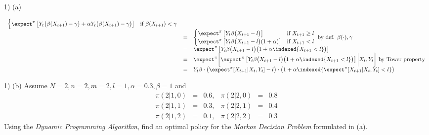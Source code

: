 \documentclass[11pt,a4paper]{article}
\begin{document}
\begin{answer}{1) (a)}
\begin{itemize}
\[\begin{array}{rcl}
\begin{cases}
        \expect^\pi\left[Y_t\big(\beta(X_{t+1})-\gamma\big)+\alpha Y_t\big(\beta(X_{t+1})-\gamma\big)\right]&\text{if }\beta(X_{t+1})<\gamma
      \end{cases}\\
      &=&\begin{cases}
        \expect^\pi\left[Y_t\beta\big(X_{t+1}-l\big)\right]&\text{if }X_{t+1}\geq l\\
        \expect^\pi\left[Y_t\beta\big(X_{t+1}-l\big)(1+\alpha)\right]&\text{if }X_{t+1}<l
      \end{cases}\text{ by def. }\beta(\cdot),\gamma\\
      &=&\expect^\pi\left[Y_t\beta\big(X_{t+1}-l\big)\big(1+\alpha\indexed\{X_{t+1}<l\}\big)\right]\\
      &=&\expect^\pi\bigg[\expect^\pi\left[Y_t\beta\big(X_{t+1}-l\big)\big(1+\alpha\indexed\{X_{t+1}<l\}\big)\right]\bigg|X_t,Y_t\bigg]\text{ by Tower property}\\
      &=&Y_t\beta\cdot\big(\expect^\pi[X_{t+1}|X_t,Y_t]-l\big)\cdot\big(1+\alpha\indexed\{\expect^\pi[X_{t+1}|X_t,Y_t]<l\}\big)
    \end{array}\]
  \end{itemize}
\end{answer}

\begin{question}{1) (b)}
  Assume $N=2,n=2,m=2,l=1,\alpha=0.3,\beta=1$ and
  \[\begin{array}{rclrcl}
    \pi(2|1,0)&=&0.6,&\pi(2|2,0)&=&0.8\\
    \pi(2|1,1)&=&0.3,&\pi(2|2,1)&=&0.4\\
    \pi(2|1,2)&=&0.1,&\pi(2|2,2)&=&0.3
  \end{array}\]
  Using the \textit{Dynamic Programming Algorithm}, find an optimal policy for the \textit{Markov Decision Problem} formulated in (a).
\end{question}
\end{document}
